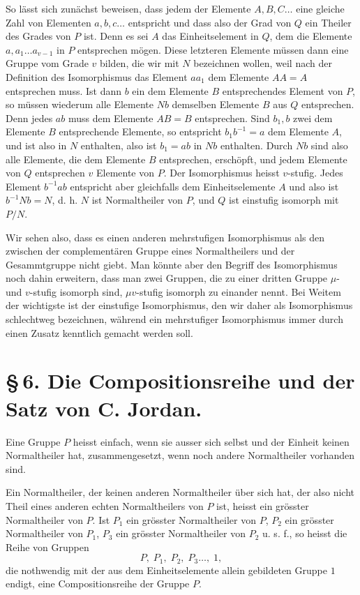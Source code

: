 \documentclass[11pt]{article}
\begin{document}
So lässt sich zunächst beweisen, dass jedem der Elemente $A,B,C\ldots$ eine gleiche Zahl von Elementen $a,b,c\ldots$ entspricht und dass also der Grad von $Q$ ein Theiler des Grades von $P$ ist. Denn es sei $A$ das Einheitselement in $Q$, dem die Elemente $a,a_1\ldots a_{v-1}$ in $P$ entsprechen mögen. Diese letzteren Elemente müssen dann eine Gruppe vom Grade $v$ bilden, die wir mit $N$ bezeichnen wollen, weil nach der Definition des Isomorphismus das Element $aa_1$ dem Elemente $AA=A$ entsprechen muss. Ist dann $b$ ein dem Elemente $B$ entsprechendes Element von $P$, so müssen wiederum alle Elemente $Nb$ demselben Elemente $B$ aus $Q$ entsprechen. Denn jedes $ab$ muss dem Elemente $AB=B$ entsprechen. Sind $b_1,b$ zwei dem Elemente $B$ entsprechende Elemente, so entspricht $b_1b^{-1}=a$ dem Elemente $A$, und ist also in $N$ enthalten, also ist $b_1=ab$ in $Nb$ enthalten. Durch $Nb$ sind also alle Elemente, die dem Elemente $B$ entsprechen, erschöpft, und jedem Elemente von $Q$ entsprechen $v$ Elemente von $P$. Der Isomorphismus heisst $v$-stufig. Jedes Element $b^{-1}ab$ entspricht aber gleichfalls dem Einheitselemente $A$ und also ist $b^{-1}Nb=N$, d. h. $N$ ist Normaltheiler von $P$, und $Q$ ist einstufig isomorph mit $P/N$.

Wir sehen also, dass es einen anderen mehrstufigen Isomorphismus als den zwischen der complementären Gruppe eines Normaltheilers und der Gesammtgruppe nicht giebt. Man könnte aber den Begriff des Isomorphismus noch dahin erweitern, dass man zwei Gruppen, die zu einer dritten Gruppe $\mu$- und $v$-stufig isomorph sind, $\mu v$-stufig isomorph zu einander nennt. Bei Weitem der wichtigste ist der einstufige Isomorphismus, den wir daher als Isomorphismus schlechtweg bezeichnen, während ein mehrstufiger Isomorphismus immer durch einen Zusatz kenntlich gemacht werden soll.

\section*{\S\,6. Die Compositionsreihe und der Satz von C. Jordan.}

Eine Gruppe $P$ heisst einfach, wenn sie ausser sich selbst und der Einheit keinen Normaltheiler hat, zusammengesetzt, wenn noch andere Normaltheiler vorhanden sind.

Ein Normaltheiler, der keinen anderen Normaltheiler über sich hat, der also nicht Theil eines anderen echten Normaltheilers von $P$ ist, heisst ein grösster Normaltheiler von $P$. Ist $P_1$ ein grösster Normaltheiler von $P$, $P_2$ ein grösster Normaltheiler von $P_1$, $P_3$ ein grösster Normaltheiler von $P_2$ u. s. f., so heisst die Reihe von Gruppen
\begin{equation}
P,\;P_1,\;P_2,\;P_3\ldots,\;1,
\tag{1}
\end{equation}
die nothwendig mit der aus dem Einheitselemente allein gebildeten Gruppe $1$ endigt, eine Compositionsreihe der Gruppe $P$.
\end{document}
